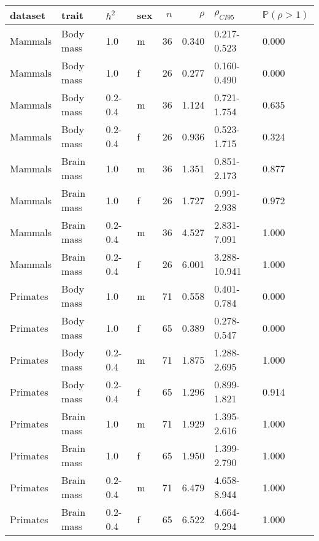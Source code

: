 \begin{tabular}{llllrrll}
\toprule
dataset & trait & $h^2$ & sex & $n$ & $\rho$ & $\rho_{CI95}$ & $\mathbb{P}(\rho > 1)$ \\
\midrule
Mammals & Body mass & 1.0 & m & 36 & 0.340 & 0.217-0.523 & 0.000 \\
Mammals & Body mass & 1.0 & f & 26 & 0.277 & 0.160-0.490 & 0.000 \\
Mammals & Body mass & 0.2-0.4 & m & 36 & 1.124 & 0.721-1.754 & 0.635 \\
Mammals & Body mass & 0.2-0.4 & f & 26 & 0.936 & 0.523-1.715 & 0.324 \\
Mammals & Brain mass & 1.0 & m & 36 & 1.351 & 0.851-2.173 & 0.877 \\
Mammals & Brain mass & 1.0 & f & 26 & 1.727 & 0.991-2.938 & 0.972 \\
Mammals & Brain mass & 0.2-0.4 & m & 36 & 4.527 & 2.831-7.091 & 1.000 \\
Mammals & Brain mass & 0.2-0.4 & f & 26 & 6.001 & 3.288-10.941 & 1.000 \\
Primates & Body mass & 1.0 & m & 71 & 0.558 & 0.401-0.784 & 0.000 \\
Primates & Body mass & 1.0 & f & 65 & 0.389 & 0.278-0.547 & 0.000 \\
Primates & Body mass & 0.2-0.4 & m & 71 & 1.875 & 1.288-2.695 & 1.000 \\
Primates & Body mass & 0.2-0.4 & f & 65 & 1.296 & 0.899-1.821 & 0.914 \\
Primates & Brain mass & 1.0 & m & 71 & 1.929 & 1.395-2.616 & 1.000 \\
Primates & Brain mass & 1.0 & f & 65 & 1.950 & 1.399-2.790 & 1.000 \\
Primates & Brain mass & 0.2-0.4 & m & 71 & 6.479 & 4.658-8.944 & 1.000 \\
Primates & Brain mass & 0.2-0.4 & f & 65 & 6.522 & 4.664-9.294 & 1.000 \\
\bottomrule
\end{tabular}
